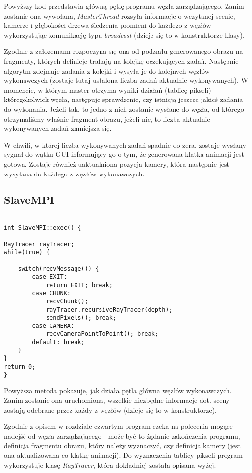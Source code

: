 Powyższy kod przedstawia główną pętlę programu węzła zarządzającego. Zanim zostanie ona wywołana, \emph{MasterThread} rozsyła informacje o wczytanej scenie, kamerze i głębokości drzewa śledzenia promieni do każdego z węzłów wykorzystując komunikację typu \emph{broadcast} (dzieje się to w konstruktorze klasy).

Zgodnie z założeniami rozpoczyna się ona od podziału generowanego obrazu na fragmenty, których definicje trafiają na kolejkę oczekujących zadań. Następnie algorytm zdejmuje zadania z kolejki i wysyła je do kolejnych węzłów wykonawczych (zostaje tutaj ustalona liczba zadań aktualnie wykonywanych). W momencie, w którym master otrzyma wyniki działań (tablicę pikseli) któregokolwiek węzła, następuje sprawdzenie, czy istnieją jeszcze jakieś zadania do wykonania. Jeżeli tak, to jedno z nich zostanie wysłane do węzła, od którego otrzymaliśmy właśnie fragment obrazu, jeżeli nie, to liczba aktualnie wykonywanych zadań zmniejsza się.

W chwili, w której liczba wykonywanych zadań spadnie do zera, zostaje wysłany sygnał do wątku GUI informujący go o tym, że generowana klatka animacji jest gotowa. Zostaje również uaktualniona pozycja kamery, która następnie jest wysyłana do każdego z węzłów wykonawczych.

\subsection{SlaveMPI}

\begin{lstlisting}[caption={Fragment klasy \emph{SlaveMPI}}]

int SlaveMPI::exec() {

RayTracer rayTracer;
while(true) {

    switch(recvMessage()) {
        case EXIT:
            return EXIT; break;
        case CHUNK:
            recvChunk();
            rayTracer.recursiveRayTracer(depth);
            sendPixels(); break;
        case CAMERA:
            recvCameraPointToPoint(); break;
        default: break;
    }
}
return 0;
}

\end{lstlisting}


Powyższa metoda pokazuje, jak działa pętla główna węzłów wykonawczych. Zanim zostanie ona uruchomiona, wszelkie niezbędne informacje dot. sceny zostają odebrane przez każdy z węzłów (dzieje się to w konstruktorze). 

Zgodnie z opisem w rozdziale czwartym program czeka na polecenia mogące nadejść od węzła zarządzającego - może być to żądanie zakończenia programu, definicja fragmentu obrazu, który należy wyznaczyć, czy definicja kamery (jest ona aktualizowana co klatkę animacji). Do wyznaczenia tablicy pikseli program wykorzystuje klasę \emph{RayTracer}, która dokładniej została opisana wyżej. 

